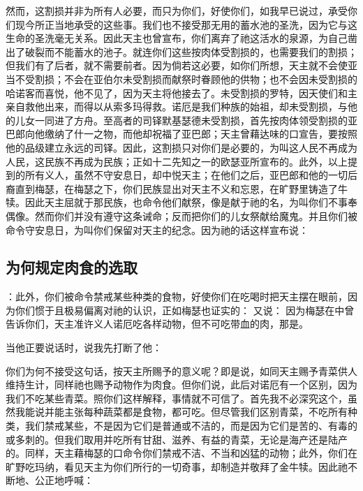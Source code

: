 然而，这割损并非为所有人必要，而只为你们，好使你们，如我早已说过，承受你们现今所正当地承受的这些事。我们也不接受那无用的蓄水池的圣洗，因为它与这生命的圣洗毫无关系。因此天主也曾宣布，你们离弃了祂这活水的泉源，为自己凿出了破裂而不能蓄水的池子。就连你们这些按肉体受割损的，也需要我们的割损；但我们有了后者，就不需要前者。因为倘若这必要，如你们所想，天主就不会使亚当不受割损；不会在亚伯尔未受割损而献祭时眷顾他的供物；也不会因未受割损的哈诺客而喜悦，他不见了，因为天主将他接去了。未受割损的罗特，因天使们和主亲自救他出来，而得以从索多玛得救。诺厄是我们种族的始祖，却未受割损，与他的儿女一同进了方舟。至高者的司铎默基瑟德未受割损，首先按肉体领受割损的亚巴郎向他缴纳了什一之物，而他却祝福了亚巴郎；天主曾藉达味的口宣告，要按照他的品级建立永远的司铎。因此，这割损只对你们是必要的，为叫这人民不再成为人民，这民族不再成为民族；正如十二先知之一的欧瑟亚所宣布的。此外，以上提到的所有义人，虽然不守安息日，却中悦天主；在他们之后，亚巴郎和他的一切后裔直到梅瑟，在梅瑟之下，你们民族显出对天主不义和忘恩，在旷野里铸造了牛犊。因此天主屈就于那民族，也命令他们献祭，像是献于祂的名，为叫你们不事奉偶像。然而你们并没有遵守这条诫命；反而把你们的儿女祭献给魔鬼。并且你们被命令守安息日，为叫你们保留对天主的纪念。因为祂的话这样宣布说：\par


\subsection{为何规定肉食的选取}

：此外，你们被命令禁戒某些种类的食物，好使你们在吃喝时把天主摆在眼前，因为你们惯于且极易偏离对祂的认识，正如梅瑟也证实的： 又说： 因为梅瑟在中曾告诉你们，天主准许义人诺厄吃各样动物，但不可吃带血的肉，那是。\par

当他正要说话时，说我先打断了他：\par

你们为何不接受这句话，按天主所赐予的意义呢？即是说，如同天主赐予青菜供人维持生计，同样祂也赐予动物作为肉食。但你们说，此后对诺厄有一个区别，因为我们不吃某些青菜。照你们这样解释，事情就不可信了。首先我不必深究这个，虽然我能说并能主张每种蔬菜都是食物，都可吃。但尽管我们区别青菜，不吃所有种类，我们禁戒某些，不是因为它们是普通或不洁的，而是因为它们是苦的、有毒的或多刺的。但我们取用并吃所有甘甜、滋养、有益的青菜，无论是海产还是陆产的。同样，天主藉梅瑟的口命令你们禁戒不洁、不当和凶猛的动物；此外，你们在旷野吃玛纳，看见天主为你们所行的一切奇事，却制造并敬拜了金牛犊。因此祂不断地、公正地呼喊：\par

